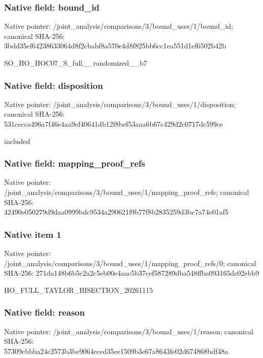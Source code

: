 \documentclass[10pt,a4paper]{article}
\begin{document}
\subsubsection{Native field: bound\_\allowbreak{}id}
Native pointer: /joint\_\allowbreak{}analysis/comparisons/3/bound\_\allowbreak{}uses/1/bound\_\allowbreak{}id; canonical SHA-256: 3bdd35ef64238633064d8f2cbabf8a570e4d8f825bb6cc1ea551d1ef6502b42b

\begingroup\raggedright\sloppy SO\_\allowbreak{}HO\_\allowbreak{}HOC07\_\allowbreak{}S\_\allowbreak{}full\_\allowbreak{}\_\allowbreak{}randomized\_\allowbreak{}\_\allowbreak{}b7\par\endgroup

\subsubsection{Native field: disposition}
Native pointer: /joint\_\allowbreak{}analysis/comparisons/3/bound\_\allowbreak{}uses/1/disposition; canonical SHA-256: 531cecca496a7f46e4aa9ef40641db12f8bef53aaa6b67c429d2c0717dc599ce

\begingroup\raggedright\sloppy included\par\endgroup

\subsubsection{Native field: mapping\_\allowbreak{}proof\_\allowbreak{}refs}
Native pointer: /joint\_\allowbreak{}analysis/comparisons/3/bound\_\allowbreak{}uses/1/mapping\_\allowbreak{}proof\_\allowbreak{}refs; canonical SHA-256: 42490e050279d9daa0999bdc9534a290621f9b77f8b2835259d3bc7a74e01af5

\subsubsection{Native item 1}
Native pointer: /joint\_\allowbreak{}analysis/comparisons/3/bound\_\allowbreak{}uses/1/mapping\_\allowbreak{}proof\_\allowbreak{}refs/0; canonical SHA-256: 271da148b6b5c2a2c5eb00e4aac5b37cef587289dba548ffba093165dc02ebb9

\begingroup\raggedright\sloppy HO\_\allowbreak{}FULL\_\allowbreak{}TAYLOR\_\allowbreak{}BISECTION\_\allowbreak{}20261115\par\endgroup

\subsubsection{Native field: reason}
Native pointer: /joint\_\allowbreak{}analysis/comparisons/3/bound\_\allowbreak{}uses/1/reason; canonical SHA-256: 57309ebbba24e2573b3be9064eced35ee1509b3e67a8643fe02d674868bdf48a
\end{document}
